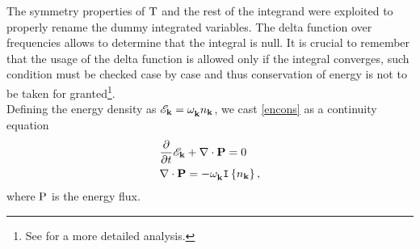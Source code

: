 The symmetry properties of $\mathrm{T}$ and the rest of the integrand were exploited to properly rename the dummy integrated variables. The delta function over frequencies 
allows to determine that the integral is null. It is crucial to remember that the usage of the delta function is allowed only if the integral converges, such condition
must be checked case by case and thus conservation of energy is not to be taken for granted\footnote{See \cite{Zakharov} for a more detailed analysis.}. \\
Defining the energy density as $\mathscr{E}_\mathbf{k} = \omega^{}_{\mathbf{k}} n_\mathbf{k}$, we cast \eqref{encons} as a continuity equation
\begin{align}
    &\frac{\partial}{\partial t} \mathscr{E}_\mathbf{k} + \nabla\cdot\mathrm{\mathbf{P}} = 0 \label{Econtinuity}\\
    &\nabla\cdot\mathrm{\mathbf{P}} = -\omega^{}_{\mathbf{k}} \mathtt{I}\left\{n_\mathbf{k}\right\}, 
\end{align}
where $\mathrm{P}$ is the energy flux. \\


